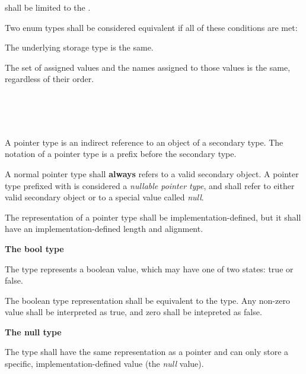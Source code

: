 \specsubsubitem
{} shall be limited to the
.

\specsubsubitem
Two enum types shall be considered equivalent if all of these conditions are
met:

\begin{subsubitemize}
\item
The underlying storage type is the same.
\item
The set of assigned values and the names assigned to those values is the same,
regardless of their order.
\end{subsubitemize}


\begin{grammar}
 \\
	\terminal{*}  \\
	 \terminal{*}  \\
\end{grammar}

\specsubsubitem
A pointer type is an indirect reference to an object of a secondary type. The
notation of a pointer type is a \terminal{*} prefix before the secondary type.

\specsubsubitem
A normal pointer type shall \textbf{always} refers to a valid secondary object.
A pointer type prefixed with  is considered a
\textit{nullable pointer type}, and shall refer to either valid secondary object
or to a special value called \textit{null}.

\specsubsubitem
The representation of a pointer type shall be implementation-defined, but it
shall have an implementation-defined length and alignment.



\textbf{The bool type}

\specsubsubitem
The  type represents a boolean value, which may have one of two
states: true or false.

\specsubsubitem
The boolean type representation shall be equivalent to the  type.
Any non-zero value shall be interpreted as true, and zero shall be intepreted as
false.

\textbf{The null type}

\specsubsubitem
The  type shall have the same representation as a pointer and can
only store a specific, implementation-defined value (the \textit{null} value).

